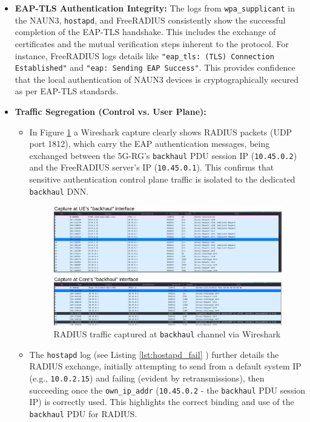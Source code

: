 \begin{itemize}
    \item \textbf{\ac{EAP-TLS} Authentication Integrity:} The logs from \texttt{wpa\_supplicant} in the \acs{NAUN3}, \texttt{hostapd}, and FreeRADIUS consistently show the successful completion of the \ac{EAP-TLS} handshake. This includes the exchange of certificates and the mutual verification steps inherent to the protocol. For instance, FreeRADIUS logs details like \texttt{"eap\_tls: (TLS) Connection Established"} and \texttt{"eap: Sending EAP Success"}. This provides confidence that the local authentication of \ac{NAUN3} devices is cryptographically secured as per \ac{EAP-TLS} standards.

    \item{
        \textbf{Traffic Segregation (Control vs. User Plane):}
        \begin{itemize}
            \item In Figure \ref{fig:RADIUS_traffic_via_backhaul} a Wireshark capture clearly shows \ac{RADIUS} packets (\ac{UDP} port 1812), which carry the \ac{EAP} authentication messages, being exchanged between the \ac{5G-RG}'s \texttt{backhaul} \ac{PDU} session \ac{IP} (\texttt{10.45.0.2}) and the FreeRADIUS server's \ac{IP} (\texttt{10.45.0.1}). This confirms that sensitive authentication control plane traffic is isolated to the dedicated \texttt{backhaul} \ac{DNN}.

            \begin{figure}
                \centering
                \includegraphics[width=0.75\linewidth]{figs/RADIUS_traffic_via_backhaul.png}
                \caption{\ac{RADIUS} traffic captured at \texttt{backhaul} channel via Wireshark}
                \label{fig:RADIUS_traffic_via_backhaul}
            \end{figure}

            \item The \texttt{hostapd} log (see Listing \ref{lst:hostapd_fail} ) further details the \ac{RADIUS} exchange, initially attempting to send from a default system \ac{IP} (e.g., \texttt{10.0.2.15}) and failing (evident by retransmissions), then succeeding once the \texttt{own\_ip\_addr} (\texttt{10.45.0.2} - the \texttt{backhaul} \ac{PDU} session \ac{IP}) is correctly used. This highlights the correct binding and use of the \texttt{backhaul} \ac{PDU} for \ac{RADIUS}.


\end{itemize}}
\end{itemize}

